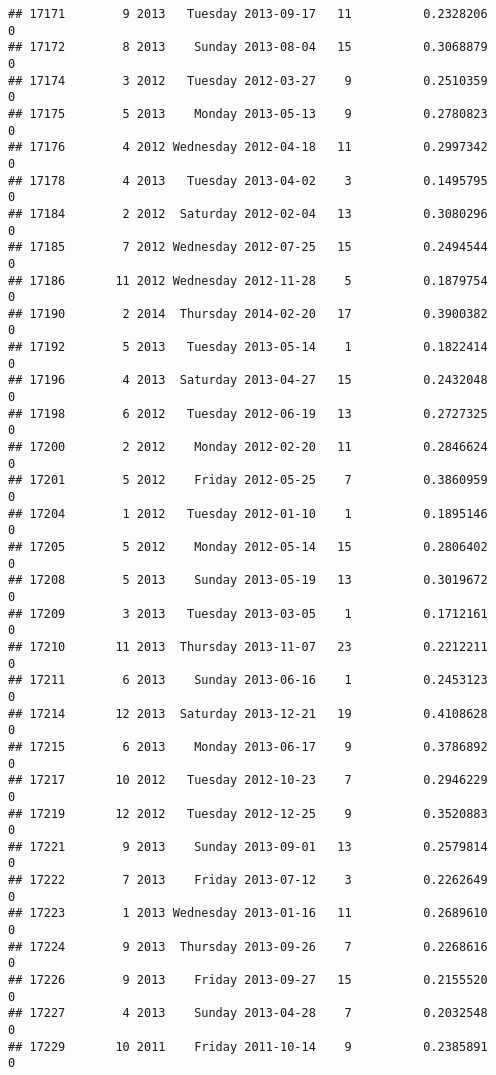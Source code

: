 \documentclass[
]{article}
\begin{document}
\begin{verbatim}
## 17171        9 2013   Tuesday 2013-09-17   11          0.2328206             0
## 17172        8 2013    Sunday 2013-08-04   15          0.3068879             0
## 17174        3 2012   Tuesday 2012-03-27    9          0.2510359             0
## 17175        5 2013    Monday 2013-05-13    9          0.2780823             0
## 17176        4 2012 Wednesday 2012-04-18   11          0.2997342             0
## 17178        4 2013   Tuesday 2013-04-02    3          0.1495795             0
## 17184        2 2012  Saturday 2012-02-04   13          0.3080296             0
## 17185        7 2012 Wednesday 2012-07-25   15          0.2494544             0
## 17186       11 2012 Wednesday 2012-11-28    5          0.1879754             0
## 17190        2 2014  Thursday 2014-02-20   17          0.3900382             0
## 17192        5 2013   Tuesday 2013-05-14    1          0.1822414             0
## 17196        4 2013  Saturday 2013-04-27   15          0.2432048             0
## 17198        6 2012   Tuesday 2012-06-19   13          0.2727325             0
## 17200        2 2012    Monday 2012-02-20   11          0.2846624             0
## 17201        5 2012    Friday 2012-05-25    7          0.3860959             0
## 17204        1 2012   Tuesday 2012-01-10    1          0.1895146             0
## 17205        5 2012    Monday 2012-05-14   15          0.2806402             0
## 17208        5 2013    Sunday 2013-05-19   13          0.3019672             0
## 17209        3 2013   Tuesday 2013-03-05    1          0.1712161             0
## 17210       11 2013  Thursday 2013-11-07   23          0.2212211             0
## 17211        6 2013    Sunday 2013-06-16    1          0.2453123             0
## 17214       12 2013  Saturday 2013-12-21   19          0.4108628             0
## 17215        6 2013    Monday 2013-06-17    9          0.3786892             0
## 17217       10 2012   Tuesday 2012-10-23    7          0.2946229             0
## 17219       12 2012   Tuesday 2012-12-25    9          0.3520883             0
## 17221        9 2013    Sunday 2013-09-01   13          0.2579814             0
## 17222        7 2013    Friday 2013-07-12    3          0.2262649             0
## 17223        1 2013 Wednesday 2013-01-16   11          0.2689610             0
## 17224        9 2013  Thursday 2013-09-26    7          0.2268616             0
## 17226        9 2013    Friday 2013-09-27   15          0.2155520             0
## 17227        4 2013    Sunday 2013-04-28    7          0.2032548             0
## 17229       10 2011    Friday 2011-10-14    9          0.2385891             0

\end{verbatim}
\end{document}
